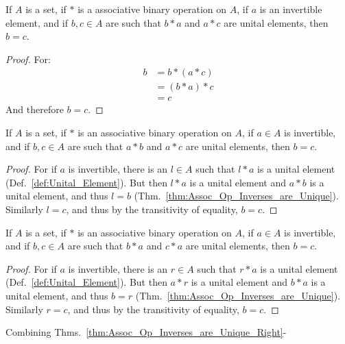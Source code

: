     \begin{theorem}
        \label{thm:Assoc_Op_Inverses_are_Unique}%
        If $A$ is a set, if $*$ is a associative binary operation on $A$, if $a$
        is an invertible element, and if $b,c\in{A}$ are such that $b*a$ and
        $a*c$ are unital elements, then $b=c$.
    \end{theorem}
    \begin{proof}
        For:
        \begin{align}
            b&=b*(a*c)
            \tag{$a*b$ is a unital element}\\
            &=(b*a)*c
            \tag{Associativity}\\
            &=c
            \tag{$b*a$ is a unital element}
        \end{align}
        And therefore $b=c$.
    \end{proof}
    \begin{theorem}
        \label{thm:Assoc_Op_Inverses_are_Unique_Right}%
        If $A$ is a set, if $*$ is an associative binary operation on $A$, if
        $a\in{A}$ is invertible, and if $b,c\in{A}$ are such that $a*b$ and
        $a*c$ are unital elements, then $b=c$.
    \end{theorem}
    \begin{proof}
        For if $a$ is invertible, there is an $l\in{A}$ such that $l*a$ is a
        unital element (Def.~\ref{def:Unital_Element}). But then $l*a$ is a
        unital element and $a*b$ is a unital element, and thus $l=b$
        (Thm.~\ref{thm:Assoc_Op_Inverses_are_Unique}). Similarly $l=c$, and thus
        by the transitivity of equality, $b=c$.
    \end{proof}
    \begin{theorem}
        \label{thm:Assoc_Op_Inverses_are_Unique_Left}%
        If $A$ is a set, if $*$ is an associative binary operation on $A$, if
        $a\in{A}$ is invertible, and if $b,c\in{A}$ are such that $b*a$ and
        $c*a$ are unital elements, then $b=c$.
    \end{theorem}
    \begin{proof}
        For if $a$ is invertible, there is an $r\in{A}$ such that $r*a$ is a
        unital element (Def.~\ref{def:Unital_Element}). But then $a*r$ is a
        unital element and $b*a$ is a unital element, and thus $b=r$
        (Thm.~\ref{thm:Assoc_Op_Inverses_are_Unique}). Similarly $r=c$, and thus
        by the transitivity of equality, $b=c$.
    \end{proof}
    Combining Thms.~\ref{thm:Assoc_Op_Inverses_are_Unique_Right}-%
